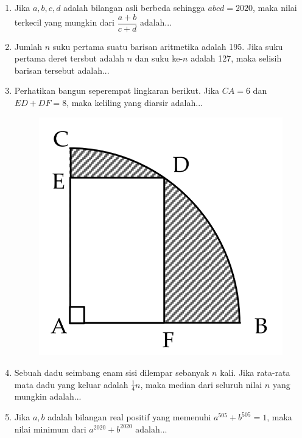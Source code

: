 \documentclass[11pt]{scrartcl}
\begin{document}
\begin{enumerate}[resume]
    \item Jika $a,b,c,d$ adalah bilangan asli berbeda sehingga $abcd=2020$, maka nilai terkecil yang mungkin dari $\dfrac{a+b}{c+d}$ adalah...
		
		\item Jumlah $n$ suku pertama suatu barisan aritmetika adalah 195. Jika suku pertama deret tersbut adalah $n$ dan suku ke-$n$ adalah 127, maka selisih barisan tersebut adalah...
		
		\item Perhatikan bangun seperempat lingkaran berikut. Jika $CA=6$ dan $ED+DF=8$, maka keliling yang diarsir adalah...
		
		\begin{figure}
		    \centering
		    \includegraphics[scale=0.5]{simulasi1-1}
		\end{figure}
		
		\item Sebuah dadu seimbang enam sisi dilempar sebanyak $n$ kali. Jika rata-rata mata dadu yang keluar adalah $\frac{1}{4}n$, maka median dari seluruh nilai $n$ yang mungkin adalah...
		
		
		\item Jika $a,b$ adalah bilangan real positif yang memenuhi $a^{505}+b^{505}=1$, maka nilai minimum dari $a^{2020}+b^{2020}$ adalah...
		

\end{enumerate}
\end{document}
